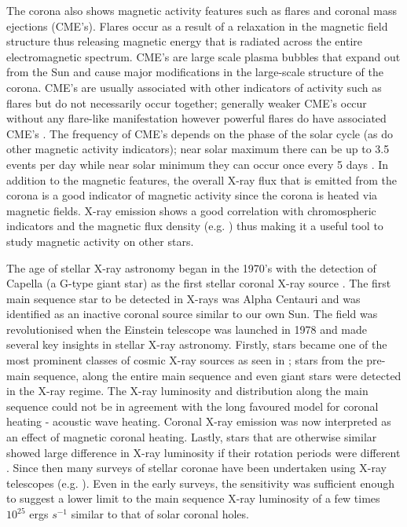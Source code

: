 The corona also shows magnetic activity features such as flares and coronal mass ejections (CME's). Flares occur as a result of a relaxation in the magnetic field structure thus releasing magnetic energy that is radiated across the entire electromagnetic spectrum. CME's are large scale plasma bubbles that expand out from the Sun and cause major modifications in the large-scale structure of the corona. CME's are usually associated with other indicators of activity such as flares but do not necessarily occur together; generally weaker CME's occur without any flare-like manifestation however powerful flares do have associated CME's \citep{Andrews_2003}. The frequency of CME's depends on the phase of the solar cycle (as do other magnetic activity indicators); near solar maximum there can be up to 3.5 events per day while near solar minimum they can occur once every 5 days \citep{Carroll_Ostlie_2006}. In addition to the magnetic features, the overall X-ray flux that is emitted from the corona is a good indicator of magnetic activity since the corona is heated via magnetic fields. X-ray emission shows a good correlation with chromospheric indicators and the magnetic flux density (e.g. \citealt{Schrijver_etal_1992,Pevtsov_etal_2003}) thus making it a useful tool to study magnetic activity on other stars.

The age of stellar X-ray astronomy began in the 1970's with the detection of Capella (a G-type giant star) as the first stellar coronal X-ray source \citep{Catura_etal_1975}. The first main sequence star to be detected in X-rays was Alpha Centauri \citep{Nugent_Garmire_1978} and was identified as an inactive coronal source similar to our own Sun. The field was revolutionised when the Einstein telescope was launched in 1978 and made several key insights in stellar X-ray astronomy. Firstly, stars became one of the most prominent classes of cosmic X-ray sources as seen in \citet{Vaiana_etal_1981}; stars from the pre-main sequence, along the entire main sequence and even giant stars were detected in the X-ray regime. The X-ray luminosity and distribution along the main sequence could not be in agreement with the long favoured model for coronal heating - acoustic wave heating. Coronal X-ray emission was now interpreted as an effect of magnetic coronal heating. Lastly, stars that are otherwise similar showed large difference in X-ray luminosity if their rotation periods were different \citep{Pallavicini_etal_1981}. Since then many surveys of stellar coronae have been undertaken using X-ray telescopes (e.g. \citealt{Fleming_etal_1995,Schmitt_1997,Nebot_etal_2013,Wood_etal_2018}). Even in the early surveys, the sensitivity was sufficient enough to suggest a lower limit to the main sequence X-ray luminosity of a few times $10^{25}$ ergs $s^{-1}$ similar to that of solar coronal holes.

